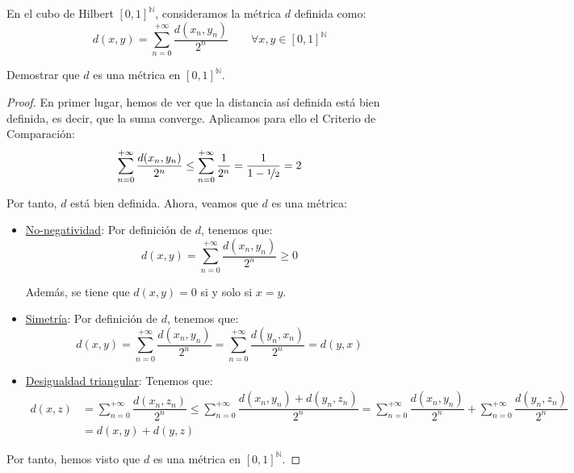 \documentclass[12pt]{article}
\begin{document}
\begin{ejercicio}
    En el cubo de Hilbert ${[0,1]}^{\mathbb{N}}$, consideramos la métrica $d$ definida como:
    \begin{equation*}
        d(x,y) = \sum_{n=0}^{+\infty} \dfrac{d(x_n,y_n)}{2^n} \qquad \forall x,y\in {[0,1]}^{\mathbb{N}}
    \end{equation*}


    Demostrar que $d$ es una métrica en ${[0,1]}^{\mathbb{N}}$.
    \begin{proof}
        En primer lugar, hemos de ver que la distancia así definida está bien definida, es decir, que la suma converge. Aplicamos para ello el Criterio de Comparación:
        \begin{equation*}
            \sum_{n=0}^{+\infty} \dfrac{d(x_n,y_n)}{2^n} \leq \sum_{n=0}^{+\infty} \dfrac{1}{2^n} = \dfrac{1}{1-\nicefrac{1}{2}} = 2
        \end{equation*}

        Por tanto, $d$ está bien definida. Ahora, veamos que $d$ es una métrica:
        \begin{itemize}
            \item \underline{No-negatividad}: Por definición de $d$, tenemos que:
                \begin{equation*}
                    d(x,y) = \sum_{n=0}^{+\infty} \dfrac{d(x_n,y_n)}{2^n} \geq 0
                \end{equation*}

                Además, se tiene que $d(x,y) = 0$ si y solo si $x = y$.
            \item \underline{Simetría}: Por definición de $d$, tenemos que:
                \begin{equation*}
                    d(x,y) = \sum_{n=0}^{+\infty} \dfrac{d(x_n,y_n)}{2^n} = \sum_{n=0}^{+\infty} \dfrac{d(y_n,x_n)}{2^n} = d(y,x)
                \end{equation*}
            \item \underline{Desigualdad triangular}: Tenemos que:
                \begin{align*}
                    d(x,z) &= \sum_{n=0}^{+\infty} \dfrac{d(x_n,z_n)}{2^n}
                    \leq \sum_{n=0}^{+\infty} \dfrac{d(x_n,y_n) + d(y_n,z_n)}{2^n}
                    = \sum_{n=0}^{+\infty} \dfrac{d(x_n,y_n)}{2^n} + \sum_{n=0}^{+\infty} \dfrac{d(y_n,z_n)}{2^n} \\
                    &= d(x,y) + d(y,z)
                \end{align*}
            \end{itemize}
        Por tanto, hemos visto que $d$ es una métrica en ${[0,1]}^{\mathbb{N}}$.
    \end{proof}
\end{ejercicio}
\end{document}
